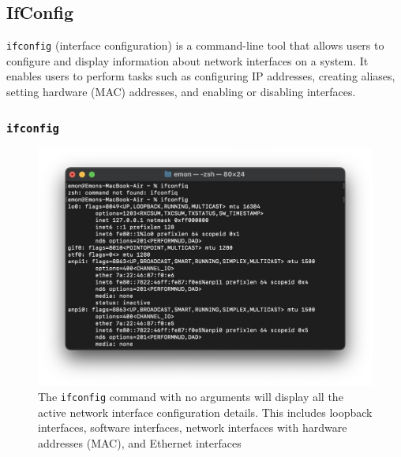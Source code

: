 \documentclass[11pt]{article}
\newcommand{\terminal}[1]{\texttt{\color{terminalcolor}#1}}
\begin{document}
\newpage

\subsection{IfConfig}
\terminal{ifconfig} (interface configuration) is a command-line tool that allows users to configure and display information about network interfaces on a system. It enables users to perform tasks such as configuring IP addresses, creating aliases, setting hardware (MAC) addresses, and enabling or disabling interfaces.
\subsubsection{\terminal{ifconfig}}
\begin{figure}[!h]
    \centering
    \includegraphics[width=\textwidth]{ifconfig1.png}
    \caption{The \terminal{ifconfig} command with no arguments will display all the active network interface configuration details. This includes loopback interfaces, software interfaces, network interfaces with hardware addresses (MAC), and Ethernet interfaces}
\end{figure}

\newpage
\end{document}
